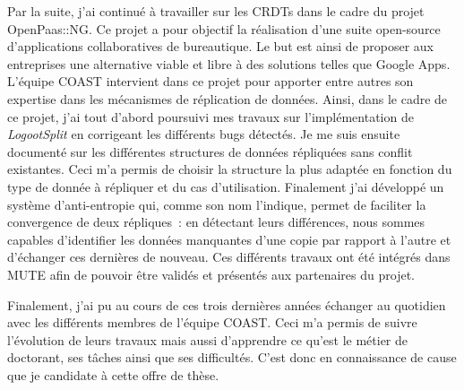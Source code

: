 \documentclass[11pt,a4paper,sans]{moderncv}        %
\newcommand{\tab}{\quad \quad}
\begin{document}

\tab Par la suite, j'ai continué à travailler sur les CRDTs dans le cadre du projet OpenPaas::NG.
Ce projet a pour objectif la réalisation d'une suite open-source
d'applications collaboratives de bureautique.
Le but est ainsi de proposer aux entreprises
une alternative viable et libre à des solutions telles que Google Apps.
L'équipe COAST intervient dans ce projet pour apporter entre autres
son expertise dans les mécanismes de réplication de données.
Ainsi, dans le cadre de ce projet, j'ai tout d'abord poursuivi mes travaux
sur l'implémentation de \emph{LogootSplit} en corrigeant les différents bugs détectés.
Je me suis ensuite documenté sur les différentes
structures de données répliquées sans conflit existantes.
Ceci m'a permis de choisir la structure la plus adaptée
en fonction du type de donnée à répliquer et du cas d'utilisation.
Finalement j'ai développé un système d'anti-entropie qui, comme son nom l'indique,
permet de faciliter la convergence de deux répliques~:
en détectant leurs différences, nous sommes capables d'identifier les données
manquantes d'une copie par rapport à l'autre et d'échanger ces dernières de nouveau.
Ces différents travaux ont été intégrés dans MUTE afin
de pouvoir être validés et présentés aux partenaires du projet.



\tab Finalement, j'ai pu au cours de ces trois dernières années
échanger au quotidien avec les différents membres de l'équipe COAST.
Ceci m'a permis de suivre l'évolution de leurs travaux
mais aussi d'apprendre ce qu'est le métier de doctorant,
ses tâches ainsi que ses difficultés.
C'est donc en connaissance de cause que je candidate à cette offre de thèse.
\end{document}
